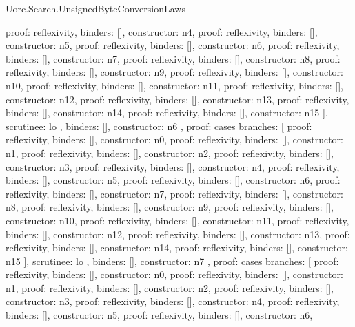 \begin{lexlean}{Uorc.Search.UnsignedByteConversionLaws}
\begin{semanticmodule}
{{{{            {proof: reflexivity{}, binders: [], constructor: n4},
            {proof: reflexivity{}, binders: [], constructor: n5},
            {proof: reflexivity{}, binders: [], constructor: n6},
            {proof: reflexivity{}, binders: [], constructor: n7},
            {proof: reflexivity{}, binders: [], constructor: n8},
            {proof: reflexivity{}, binders: [], constructor: n9},
            {proof: reflexivity{}, binders: [], constructor: n10},
            {proof: reflexivity{}, binders: [], constructor: n11},
            {proof: reflexivity{}, binders: [], constructor: n12},
            {proof: reflexivity{}, binders: [], constructor: n13},
            {proof: reflexivity{}, binders: [], constructor: n14},
            {proof: reflexivity{}, binders: [], constructor: n15}
          ],
          scrutinee: lo
        },
        binders: [],
        constructor: n6
      },
      {
        proof: cases{
          branches: [
            {proof: reflexivity{}, binders: [], constructor: n0},
            {proof: reflexivity{}, binders: [], constructor: n1},
            {proof: reflexivity{}, binders: [], constructor: n2},
            {proof: reflexivity{}, binders: [], constructor: n3},
            {proof: reflexivity{}, binders: [], constructor: n4},
            {proof: reflexivity{}, binders: [], constructor: n5},
            {proof: reflexivity{}, binders: [], constructor: n6},
            {proof: reflexivity{}, binders: [], constructor: n7},
            {proof: reflexivity{}, binders: [], constructor: n8},
            {proof: reflexivity{}, binders: [], constructor: n9},
            {proof: reflexivity{}, binders: [], constructor: n10},
            {proof: reflexivity{}, binders: [], constructor: n11},
            {proof: reflexivity{}, binders: [], constructor: n12},
            {proof: reflexivity{}, binders: [], constructor: n13},
            {proof: reflexivity{}, binders: [], constructor: n14},
            {proof: reflexivity{}, binders: [], constructor: n15}
          ],
          scrutinee: lo
        },
        binders: [],
        constructor: n7
      },
      {
        proof: cases{
          branches: [
            {proof: reflexivity{}, binders: [], constructor: n0},
            {proof: reflexivity{}, binders: [], constructor: n1},
            {proof: reflexivity{}, binders: [], constructor: n2},
            {proof: reflexivity{}, binders: [], constructor: n3},
            {proof: reflexivity{}, binders: [], constructor: n4},
            {proof: reflexivity{}, binders: [], constructor: n5},
            {proof: reflexivity{}, binders: [], constructor: n6},
}}}}
\end{semanticmodule}
\end{lexlean}

